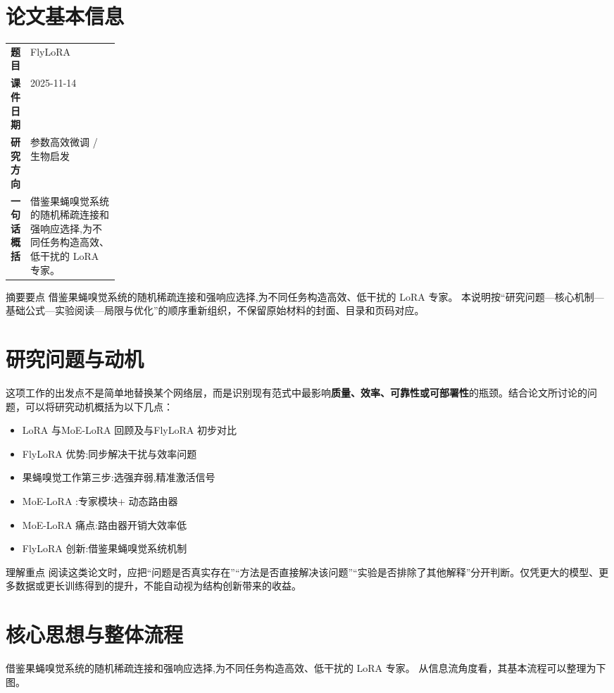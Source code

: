 \documentclass[UTF8,11pt,a4paper]{ctexart}
\newcommand{\term}[1]{\textbf{\textcolor{mainblue}{#1}}}
\begin{document}
\section{论文基本信息}
\begin{center}
\begin{tabularx}{0.94\linewidth}{>{\bfseries}p{0.18\linewidth}X}
\toprule
题目 & FlyLoRA\\
课件日期 & 2025-11-14\\
研究方向 & 参数高效微调 / 生物启发\\
一句话概括 & 借鉴果蝇嗅觉系统的随机稀疏连接和强响应选择,为不同任务构造高效、低干扰的 LoRA 专家。\\
\bottomrule
\end{tabularx}
\end{center}

\begin{infobox}{摘要要点}
借鉴果蝇嗅觉系统的随机稀疏连接和强响应选择,为不同任务构造高效、低干扰的 LoRA 专家。 本说明按“研究问题—核心机制—基础公式—实验阅读—局限与优化”的顺序重新组织，不保留原始材料的封面、目录和页码对应。
\end{infobox}

\section{研究问题与动机}
这项工作的出发点不是简单地替换某个网络层，而是识别现有范式中最影响\term{质量、效率、可靠性或可部署性}的瓶颈。结合论文所讨论的问题，可以将研究动机概括为以下几点：
\begin{itemize}
\item LoRA 与MoE-LoRA 回顾及与FlyLoRA 初步对比
\item FlyLoRA 优势:同步解决干扰与效率问题
\item 果蝇嗅觉工作第三步:选强弃弱,精准激活信号
\item MoE-LoRA :专家模块+ 动态路由器
\item MoE-LoRA 痛点:路由器开销大效率低
\item FlyLoRA 创新:借鉴果蝇嗅觉系统机制
\end{itemize}

\begin{notebox}{理解重点}
阅读这类论文时，应把“问题是否真实存在”“方法是否直接解决该问题”“实验是否排除了其他解释”分开判断。仅凭更大的模型、更多数据或更长训练得到的提升，不能自动视为结构创新带来的收益。
\end{notebox}

\section{核心思想与整体流程}
借鉴果蝇嗅觉系统的随机稀疏连接和强响应选择,为不同任务构造高效、低干扰的 LoRA 专家。 从信息流角度看，其基本流程可以整理为下图。
\end{document}
